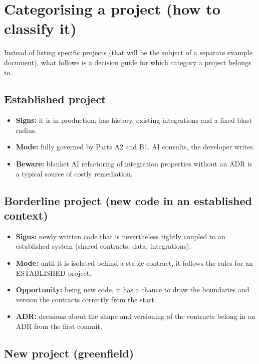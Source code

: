 \section{Categorising a project (how to classify it)}

Instead of listing specific projects (that will be the subject of a separate example document), what follows is a decision guide for which category a project belongs to.

\subsection{Established project}

\begin{itemize}
\item \textbf{Signs:} it is in production, has history, existing integrations and a fixed blast radius.
\item \textbf{Mode:} fully governed by Parts A2 and B1. AI consults, the developer writes.
\item \textbf{Beware:} blanket AI refactoring of integration properties without an ADR is a typical source of costly remediation.
\end{itemize}

\subsection{Borderline project (new code in an established context)}

\begin{itemize}
\item \textbf{Signs:} newly written code that is nevertheless tightly coupled to an established system (shared contracts, data, integrations).
\item \textbf{Mode:} until it is isolated behind a stable contract, it follows the rules for an ESTABLISHED project.
\item \textbf{Opportunity:} being new code, it has a chance to draw the boundaries and version the contracts correctly from the start.
\item \textbf{ADR:} decisions about the shape and versioning of the contracts belong in an ADR from the first commit.
\end{itemize}

\subsection{New project (greenfield)}


